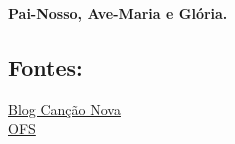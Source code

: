 \documentclass[a4paper,12pt]{extarticle} \usepackage[utf8]{inputenc}
\begin{document}
\begin{center}
  \large
  \textbf{Pai-Nosso, Ave-Maria e Glória.}
\end{center}




\vfill

\begin{center}
\subsection*{Fontes:}
\href{https://blog.cancaonova.com/tododemaria/a-historia-de-nossa-senhora-dos-anjos/}{Blog Canção Nova}\\ 
\href{https://ofs-sp.org.br/nossas-fraternidades/}{OFS}
\end{center}
\end{document}
